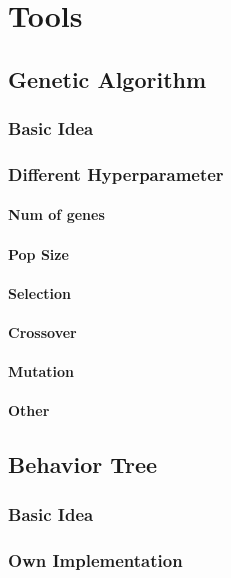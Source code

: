 \chapter{Tools}
\section{Genetic Algorithm}
\subsection{Basic Idea}
\subsection{Different Hyperparameter}
\subsubsection{Num of genes}
\subsubsection{Pop Size}
\subsubsection{Selection}
\subsubsection{Crossover}
\subsubsection{Mutation}
\subsubsection{Other}

\section{Behavior Tree}
\subsection{Basic Idea}
\subsection{Own Implementation}